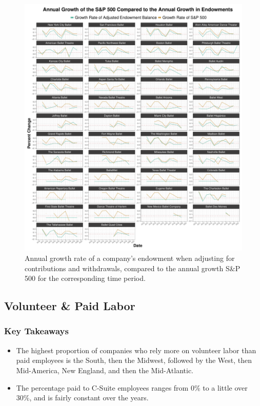\documentclass[Dance Data
Project,article,submit,moreauthors,pdftex]{mdpi}
\providecommand{\tightlist}{%
  \setlength{\itemsep}{0pt}\setlength{\parskip}{0pt}}
\begin{document}
\begin{figure}[H]
\includegraphics[width=0.9\linewidth,]{../images/annual-growth} \caption{\label{fig:annual-growth-endowment}Annual growth rate of a company's endowment when adjusting for contributions and withdrawals, compared to the annual growth S\&P 500 for the corresponding time period.}\label{fig:unnamed-chunk-13}
\end{figure}

\hypertarget{volunteer-paid-labor}{%
\subsection{Volunteer \& Paid Labor}\label{volunteer-paid-labor}}

\hypertarget{key-takeaways-1}{%
\subsubsection{Key Takeaways}\label{key-takeaways-1}}

\begin{itemize}
\tightlist
\item
  The highest proportion of companies who rely more on volunteer labor
  than paid employees is the South, then the Midwest, followed by the
  West, then Mid-America, New England, and then the Mid-Atlantic.\\
\item
  The percentage paid to C-Suite employees ranges from 0\% to a little
  over 30\%, and is fairly constant over the years.
\end{itemize}
\end{document}
